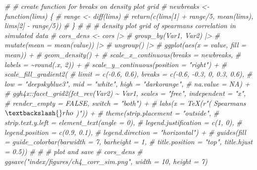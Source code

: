 \documentclass[12pt, twoside]{amherstthesis}
\newenvironment{Shaded}{\begin{snugshade}}{\end{snugshade}}
\newcommand{\CommentTok}[1]{\textcolor[rgb]{0.56,0.35,0.01}{\textit{#1}}}
\begin{document}
\begin{Shaded}
\begin{Highlighting}[]
\CommentTok{\# \# create function for breaks on density plot grid}
\CommentTok{\# newbreaks \textless{}{-} function(lims) \{}
\CommentTok{\#   range \textless{}{-} diff(lims)}
\CommentTok{\#   return(c(lims[1] + range/5, mean(lims), lims[2] {-} range/5))}
\CommentTok{\# \}}
\CommentTok{\# }
\CommentTok{\# \# density plot grid of spearman\textquotesingle{}s correlation in simulated data}
\CommentTok{\# cors\_dens \textless{}{-} cors |\textgreater{} }
\CommentTok{\#   group\_by(Var1, Var2) |\textgreater{} }
\CommentTok{\#   mutate(mean = mean(value)) |\textgreater{} }
\CommentTok{\#   ungroup() |\textgreater{} }
\CommentTok{\#   ggplot(aes(x = value, fill = mean)) +}
\CommentTok{\#   geom\_density() + }
\CommentTok{\#   scale\_x\_continuous(breaks = newbreaks, }
\CommentTok{\#                      labels = \textasciitilde{}round(.x, 2)) +}
\CommentTok{\#   scale\_y\_continuous(position = "right") +}
\CommentTok{\#   scale\_fill\_gradient2(}
\CommentTok{\#     limit = c({-}0.6, 0.6), breaks = c({-}0.6, {-}0.3, 0, 0.3, 0.6),}
\CommentTok{\#     low = "deepskyblue3", mid = "white", high = "darkorange", }
\CommentTok{\#     na.value = NA) +}
\CommentTok{\#   ggh4x::facet\_grid2(fct\_rev(Var2) \textasciitilde{} Var1, scales = "free", independent = "x", }
\CommentTok{\#                      render\_empty = FALSE, switch = "both") +}
\CommentTok{\#   labs(x = TeX(r"( Spearman\textquotesingle{}s $\textbackslash{}rho$ )")) +}
\CommentTok{\#   theme(strip.placement = "outside", }
\CommentTok{\#         strip.text.y.left = element\_text(angle = 0), }
\CommentTok{\#         legend.justification = c(1, 0),}
\CommentTok{\#         legend.position = c(0.9, 0.1),}
\CommentTok{\#         legend.direction = "horizontal") +}
\CommentTok{\#   guides(fill = guide\_colorbar(barwidth = 7, barheight = 1,}
\CommentTok{\#                                title.position = "top", title.hjust = 0.5))}
\CommentTok{\# }
\CommentTok{\# \# plot and save}
\CommentTok{\# cors\_dens}
\CommentTok{\# ggsave("index/figures/ch4\_corr\_sim.png", width = 10, height = 7)}


\end{Highlighting}
\end{Shaded}
\end{document}
